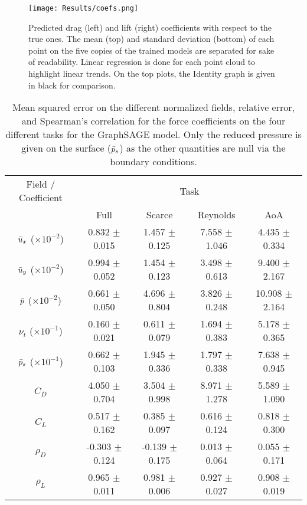 \begin{figure}
	\centering
	\texttt{[image: Results/coefs.png]}
	\caption{Predicted drag (left) and lift (right) coefficients with respect to the true ones. The mean (top) and standard deviation (bottom) of each point on the five copies of the trained models are separated for sake of readability. Linear regression is done for each point cloud to highlight linear trends. On the top plots, the Identity graph is given in black for comparison.}
	\label{fig:coefs}
\end{figure}

\begin{table}
	\caption{Mean squared error on the different normalized fields, relative error, and Spearman's correlation for the force coefficients on the four different tasks for the GraphSAGE model. Only the reduced pressure is given on the surface ($\Bar{p}_s$) as the other quantities are null via the boundary conditions.}
	\label{tab:score_GSAGE}
	\centering
	\begin{tabular}{ccccc}
		\toprule
		Field / Coefficient & \multicolumn{4}{c}{Task}  \\
		& Full & Scarce & Reynolds & AoA \\
		\midrule
		$\Bar{u}_x$ ($\times 10^{-2}$) & 0.832 $\pm$ 0.015 & 1.457 $\pm$ 0.125 & 7.558 $\pm$ 1.046 & 4.435 $\pm$ 0.334 \\
		$\Bar{u}_y$ ($\times 10^{-2}$) & 0.994 $\pm$ 0.052 & 1.454 $\pm$ 0.123 & 3.498 $\pm$ 0.613 & 9.400 $\pm$ 2.167 \\
		$\Bar{p}$ ($\times 10^{-2}$) & 0.661 $\pm$ 0.050 & 4.696 $\pm$ 0.804 & 3.826 $\pm$ 0.248 & 10.908 $\pm$ 2.164 \\
		$\nu_t$ ($\times 10^{-1}$) & 0.160 $\pm$ 0.021 & 0.611 $\pm$ 0.079 & 1.694 $\pm$ 0.383 & 5.178 $\pm$ 0.365 \\
		$\Bar{p}_s$ ($\times 10^{-1}$) & 0.662 $\pm$ 0.103 & 1.945 $\pm$ 0.336 & 1.797 $\pm$ 0.338 & 7.638 $\pm$ 0.945 \\
		\midrule
		$C_D$ & 4.050 $\pm$ 0.704 & 3.504 $\pm$ 0.998 & 8.971 $\pm$ 1.278 & 5.589 $\pm$ 1.090 \\
		$C_L$ & 0.517 $\pm$ 0.162 & 0.385 $\pm$ 0.097 & 0.616 $\pm$ 0.124 & 0.818 $\pm$ 0.300 \\
		$\rho_D$ & -0.303 $\pm$ 0.124 & -0.139 $\pm$ 0.175 & 0.013 $\pm$ 0.064 & 0.055 $\pm$ 0.171 \\
		$\rho_L$ & 0.965 $\pm$ 0.011 & 0.981 $\pm$ 0.006 & 0.927 $\pm$ 0.027 & 0.908 $\pm$ 0.019 \\
		\bottomrule
	\end{tabular}
\end{table}

